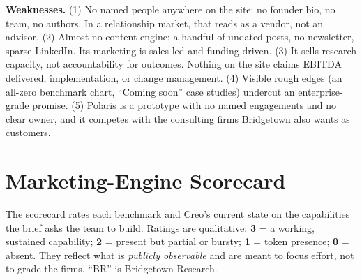 \documentclass[11pt]{article}
\begin{document}
\textbf{Weaknesses.} (1) No named people anywhere on the site: no founder bio, no
team, no authors. In a relationship market, that reads as a vendor, not an advisor.
(2) Almost no content engine: a handful of undated posts, no newsletter, sparse
LinkedIn. Its marketing is sales-led and funding-driven. (3) It sells research
capacity, not accountability for outcomes. Nothing on the site claims EBITDA
delivered, implementation, or change management. (4) Visible rough edges (an
all-zero benchmark chart, ``Coming soon'' case studies) undercut an enterprise-grade promise. (5) Polaris is a prototype with no
named engagements and no clear owner, and it competes with the consulting firms
Bridgetown also wants as customers.

\clearpage
\section{Marketing-Engine Scorecard}\label{sec:scorecard}

The scorecard rates each benchmark and Creo's current state on the capabilities the
brief asks the team to build. Ratings are qualitative: \textbf{3} = a working,
sustained capability; \textbf{2} = present but partial or bursty; \textbf{1} = token
presence; \textbf{0} = absent. They reflect what is \emph{publicly observable} and are
meant to focus effort, not to grade the firms. ``BR'' is Bridgetown Research.
\end{document}

